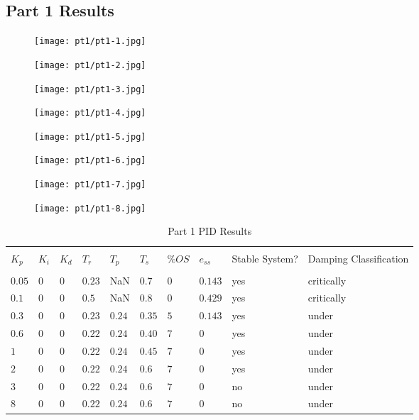 
\subsection{Part 1 Results}
\begin{figure}[H]
	\texttt{[image: pt1/pt1-1.jpg]}
\end{figure}
\begin{figure}[H]
	\texttt{[image: pt1/pt1-2.jpg]}
\end{figure}
\begin{figure}[H]
	\texttt{[image: pt1/pt1-3.jpg]}
\end{figure}
\begin{figure}[H]
	\texttt{[image: pt1/pt1-4.jpg]}
\end{figure}
\begin{figure}[H]
	\texttt{[image: pt1/pt1-5.jpg]}
\end{figure}
\begin{figure}[H]
	\texttt{[image: pt1/pt1-6.jpg]}
\end{figure}
\begin{figure}[H]
	\texttt{[image: pt1/pt1-7.jpg]}
\end{figure}
\begin{figure}[H]
	\texttt{[image: pt1/pt1-8.jpg]}
\end{figure} 
\begin{table}[H]
	\begin{tabularx}{\textwidth}{XXXXXXXXXX}
		\toprule
		\\ $K_p$ & $K_i$ & $K_d$ & $T_r$ & $T_p$ & $T_s$ & $\%OS$ & $e_{ss}$ 
		& Stable System? & Damping Classification
		\\ \midrule
		\\ $0.05$ & $0$ & $0$ & $0.23$ & NaN & $0.7$ & $0$ & $0.143$ & yes & critically
\\ $0.1$ & $0$ & $0$ & $0.5$ & NaN & $0.8$ & $0$ & $0.429$ & yes & critically
\\ $0.3$ & $0$ & $0$ & $0.23$ & $0.24$ & $0.35$ & $5$ & $0.143$ & yes & under
\\ $0.6$ & $0$ & $0$ & $0.22$ & $0.24$ & $0.40$ & $7$ & $0$ & yes & under
\\ $1$ & $0$ & $0$ & $0.22$ & $0.24$ & $0.45$ & $7$ & $0$ & yes & under
\\ $2$ & $0$ & $0$ & $0.22$ & $0.24$ & $0.6$ & $7$ & $0$ & yes & under
\\ $3$ & $0$ & $0$ & $0.22$ & $0.24$ & $0.6$ & $7$ & $0$ & no & under
\\ $8$ & $0$ & $0$ & $0.22$ & $0.24$ & $0.6$ & $7$ & $0$ & no & under
		\\ \bottomrule
	\end{tabularx}
	\caption{Part 1 PID Results}
	\label{tab:pid1SimResults}
\end{table}
